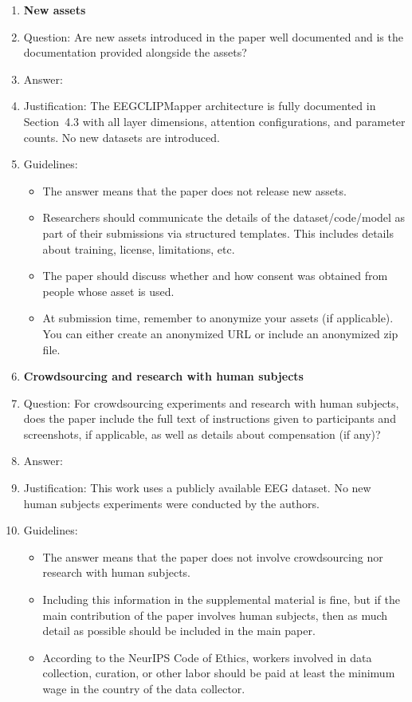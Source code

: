 \documentclass{article}
\begin{document}
\begin{enumerate}
\item {\bf New assets}
    \item[] Question: Are new assets introduced in the paper well documented and is the documentation provided alongside the assets?
    \item[] Answer: \answerYes{}
    \item[] Justification: The EEGCLIPMapper architecture is fully documented in Section~4.3 with all layer dimensions, attention configurations, and parameter counts. No new datasets are introduced.
    \item[] Guidelines:
    \begin{itemize}
        \item The answer \answerNA{} means that the paper does not release new assets.
        \item Researchers should communicate the details of the dataset/code/model as part of their submissions via structured templates. This includes details about training, license, limitations, etc.
        \item The paper should discuss whether and how consent was obtained from people whose asset is used.
        \item At submission time, remember to anonymize your assets (if applicable). You can either create an anonymized URL or include an anonymized zip file.
    \end{itemize}

\item {\bf Crowdsourcing and research with human subjects}
    \item[] Question: For crowdsourcing experiments and research with human subjects, does the paper include the full text of instructions given to participants and screenshots, if applicable, as well as details about compensation (if any)?
    \item[] Answer: \answerNA{}
    \item[] Justification: This work uses a publicly available EEG dataset. No new human subjects experiments were conducted by the authors.
    \item[] Guidelines:
    \begin{itemize}
        \item The answer \answerNA{} means that the paper does not involve crowdsourcing nor research with human subjects.
        \item Including this information in the supplemental material is fine, but if the main contribution of the paper involves human subjects, then as much detail as possible should be included in the main paper.
        \item According to the NeurIPS Code of Ethics, workers involved in data collection, curation, or other labor should be paid at least the minimum wage in the country of the data collector.
    \end{itemize}


\end{enumerate}
\end{document}
